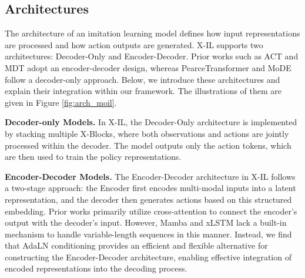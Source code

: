 \subsection{Architectures} \label{sec: architectures}
The architecture of an imitation learning model defines how input representations are processed and how action outputs are generated. X-IL supports two architectures: Decoder-Only and Encoder-Decoder.
Prior works such as ACT \cite{zhao2023learning} and MDT \cite{reuss2024multimodaldiffusiontransformerlearning} adopt an encoder-decoder design, whereas PearceTransformer \cite{pearce2023imitating} and MoDE \cite{reuss2024efficient} follow a decoder-only approach.
Below, we introduce these architectures and explain their integration within our framework. The illustrations of them are given in Figure \ref{fig:arch_moil}. 

\textbf{Decoder-only Models.}
In X-IL, the Decoder-Only architecture is implemented by stacking multiple X-Blocks, where both observations and actions are jointly processed within the decoder. The model outputs only the action tokens, which are then used to train the policy representations.



\textbf{Encoder-Decoder Models.}
The Encoder-Decoder architecture in X-IL follows a two-stage approach: the Encoder first encodes multi-modal inputs into a latent representation, and the decoder then generates actions based on this structured embedding. 
Prior works primarily utilize cross-attention to connect the encoder’s output with the decoder’s input. However, Mamba and xLSTM lack a built-in mechanism to handle variable-length sequences in this manner. Instead, we find that AdaLN conditioning provides an efficient and flexible alternative for constructing the Encoder-Decoder architecture, enabling effective integration of encoded representations into the decoding process.

